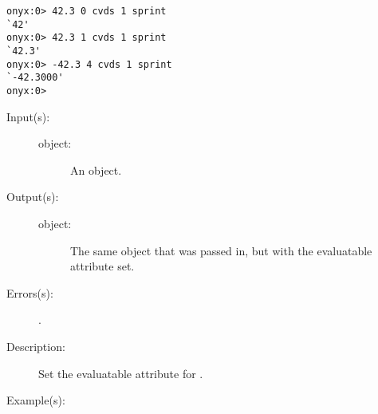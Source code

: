 \begin{description}
\begin{description}
\begin{verbatim}
onyx:0> 42.3 0 cvds 1 sprint
`42'
onyx:0> 42.3 1 cvds 1 sprint
`42.3'
onyx:0> -42.3 4 cvds 1 sprint
`-42.3000'
onyx:0>
		\end{verbatim}
	\end{description}
\label{systemdict:cve}
\item[{\onyxop{object}{cve}{object}}: ]
	\begin{description}\item[]
	\item[Input(s): ]
		\begin{description}\item[]
		\item[object: ]
			An object.
		\end{description}
	\item[Output(s): ]
		\begin{description}\item[]
		\item[object: ]
			The same object that was passed in, but with the
			evaluatable attribute set.
		\end{description}
	\item[Errors(s): ]
		\begin{description}\item[]
		\item[.]
		\end{description}
	\item[Description: ]
		Set the evaluatable attribute for .
	\item[Example(s): ]\begin{verbatim}


\end{verbatim}
\end{description}
\end{description}
